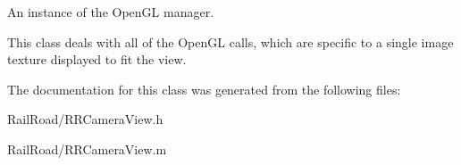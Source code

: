 An instance of the Open\-G\-L manager. 

This class deals with all of the Open\-G\-L calls, which are specific to a single image texture displayed to fit the view. 

The documentation for this class was generated from the following files\-:\begin{DoxyCompactItemize}
\item 
Rail\-Road/R\-R\-Camera\-View.\-h\item 
Rail\-Road/R\-R\-Camera\-View.\-m\end{DoxyCompactItemize}
